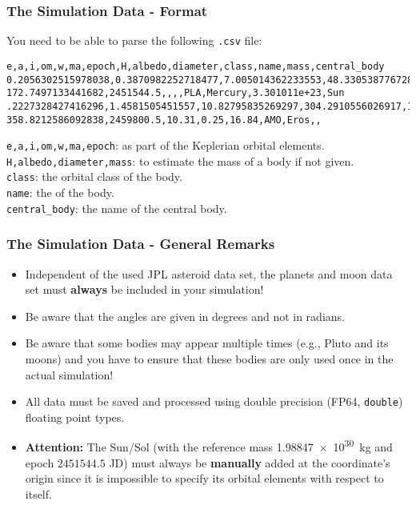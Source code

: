 \begin{frame}[fragile]
    \frametitle{The Simulation Data - Format}

    You need to be able to parse the following \texttt{.csv} file:
    \begin{verbatim}
e,a,i,om,w,ma,epoch,H,albedo,diameter,class,name,mass,central_body
0.2056302515978038,0.3870982252718477,7.005014362233553,48.33053877672862,29.12427943500334, 172.7497133441682,2451544.5,,,,PLA,Mercury,3.301011e+23,Sun
.2227328427416296,1.4581505451557,10.82795835269297,304.2910556026917,178.9325148860407, 358.8212586092838,2459800.5,10.31,0.25,16.84,AMO,Eros,,
    \end{verbatim}
    \vfill
    \texttt{e,a,i,om,w,ma,epoch}: as part of the Keplerian orbital elements. \\
    \texttt{H,albedo,diameter,mass}: to estimate the mass of a body if not given. \\
    \texttt{class}: the orbital class of the body. \\
    \texttt{name}: the  of the body. \\
    \texttt{central_body}: the name of the central body.
\end{frame}

\begin{frame}
    \frametitle{The Simulation Data - General Remarks}
    \begin{itemize}
        \item Independent of the used JPL asteroid data set, the planets and moon data set must \textbf{always} be included in your simulation!
        \item Be aware that the angles are given in degrees and not in radians.
        \item Be aware that some bodies may appear multiple times (e.g., Pluto and its moons) and you have to ensure that these bodies are only used once in the actual simulation!
        \item All data must be saved and processed using double precision (FP64, \texttt{double}) floating point types.
        \item \textbf{Attention:} The Sun/Sol (with the reference mass \SI{1.98847e30}{\kilo\gram} and epoch $2451544.5$ JD) must always be \textbf{manually} added at the coordinate's origin since it is impossible to specify its orbital elements with respect to itself.
    \end{itemize}
\end{frame}
